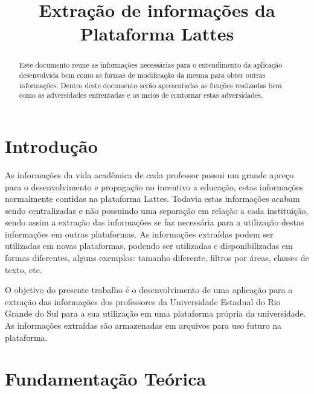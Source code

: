 \documentclass[conference]{IEEEtran}
\begin{document}
\title{Extração de informações da Plataforma Lattes}

\author{
}

\maketitle

\begin{abstract}
Este documento reune as informações necessárias para o entendimento da aplicação desenvolvida bem como as formas de modificação da mesma para obter outras informações. Dentro deste documento serão apresentadas as funções realizadas bem como as adversidades enfrentadas e os meios de contornar estas adversidades.
\end{abstract}


\section{Introdução}
As informações da vida acadêmica de cada professor possui um grande apreço para o desenvolvimento e propagação no incentivo a educação, estas informações normalmente contidas na plataforma Lattes. Todavia estas informações acabam sendo centralizadas e não possuindo uma separação em relação a cada instituição, sendo assim a extração das informações se faz necessária para a utilização destas informações em outras plataformas. As informações extraídas podem ser utilizadas em novas plataformas, podendo ser utilizadas e disponibilizadas em formas diferentes, alguns exemplos: tamanho diferente, filtros por áreas, classes de texto, etc.

O objetivo do presente trabalho é o desenvolvimento de uma aplicação para a extração das informações dos professores da Universidade Estadual do Rio Grande do Sul para a sua utilização em uma plataforma própria da universidade. As informações extraídas são armazenadas em arquivos para uso futuro na plataforma.

\section{Fundamentação Teórica}
\end{document}
